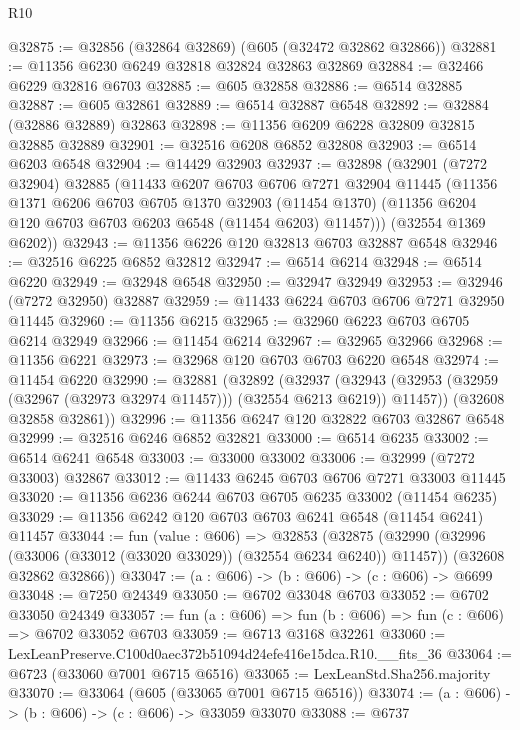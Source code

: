 \begin{lexlean}{R10}
\begin{coremodule}
@32875 := @32856 (@32864 @32869) (@605 (@32472 @32862 @32866))
@32881 := @11356 @6230 @6249 @32818 @32824 @32863 @32869
@32884 := @32466 @6229 @32816 @6703
@32885 := @605 @32858
@32886 := @6514 @32885
@32887 := @605 @32861
@32889 := @6514 @32887 @6548
@32892 := @32884 (@32886 @32889) @32863
@32898 := @11356 @6209 @6228 @32809 @32815 @32885 @32889
@32901 := @32516 @6208 @6852 @32808
@32903 := @6514 @6203 @6548
@32904 := @14429 @32903
@32937 := @32898
    (@32901
      (@7272 @32904)
      @32885
      (@11433
        @6207
        @6703
        @6706
        @7271
        @32904
        @11445
        (@11356
          @1371
          @6206
          @6703
          @6705
          @1370
          @32903
          (@11454 @1370)
          (@11356 @6204 @120 @6703 @6703 @6203 @6548 (@11454 @6203) @11457)))
      (@32554 @1369 @6202))
@32943 := @11356 @6226 @120 @32813 @6703 @32887 @6548
@32946 := @32516 @6225 @6852 @32812
@32947 := @6514 @6214
@32948 := @6514 @6220
@32949 := @32948 @6548
@32950 := @32947 @32949
@32953 := @32946 (@7272 @32950) @32887
@32959 := @11433 @6224 @6703 @6706 @7271 @32950 @11445
@32960 := @11356 @6215
@32965 := @32960 @6223 @6703 @6705 @6214 @32949
@32966 := @11454 @6214
@32967 := @32965 @32966
@32968 := @11356 @6221
@32973 := @32968 @120 @6703 @6703 @6220 @6548
@32974 := @11454 @6220
@32990 := @32881
    (@32892
      (@32937
        (@32943 (@32953 (@32959 (@32967 (@32973 @32974 @11457))) (@32554 @6213 @6219)) @11457))
      (@32608 @32858 @32861))
@32996 := @11356 @6247 @120 @32822 @6703 @32867 @6548
@32999 := @32516 @6246 @6852 @32821
@33000 := @6514 @6235
@33002 := @6514 @6241 @6548
@33003 := @33000 @33002
@33006 := @32999 (@7272 @33003) @32867
@33012 := @11433 @6245 @6703 @6706 @7271 @33003 @11445
@33020 := @11356 @6236 @6244 @6703 @6705 @6235 @33002 (@11454 @6235)
@33029 := @11356 @6242 @120 @6703 @6703 @6241 @6548 (@11454 @6241) @11457
@33044 := fun (value : @606) =>
  @32853
    (@32875
      (@32990 (@32996 (@33006 (@33012 (@33020 @33029)) (@32554 @6234 @6240)) @11457))
      (@32608 @32862 @32866))
@33047 := (a : @606) -> (b : @606) -> (c : @606) -> @6699
@33048 := @7250 @24349
@33050 := @6702 @33048 @6703
@33052 := @6702 @33050 @24349
@33057 := fun (a : @606) => fun (b : @606) => fun (c : @606) => @6702 @33052 @6703
@33059 := @6713 @3168 @32261
@33060 := LexLeanPreserve.C100d0aec372b51094d24efe416e15dca.R10.__fits_36
@33064 := @6723 (@33060 @7001 @6715 @6516)
@33065 := LexLeanStd.Sha256.majority
@33070 := @33064 (@605 (@33065 @7001 @6715 @6516))
@33074 := (a : @606) -> (b : @606) -> (c : @606) -> @33059 @33070
@33088 := @6737

\end{coremodule}
\end{lexlean}
